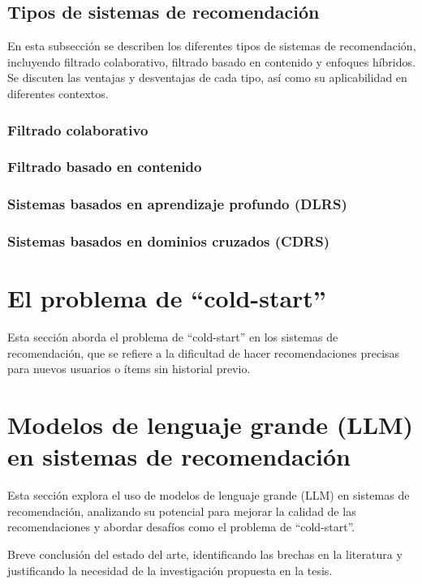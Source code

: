 	\subsection{Tipos de sistemas de recomendación}
	En esta subsección se describen los diferentes tipos de sistemas de recomendación, incluyendo filtrado colaborativo, filtrado basado en contenido y enfoques híbridos. Se discuten las ventajas y desventajas de cada tipo, así como su aplicabilidad en diferentes contextos.

		\subsubsection{Filtrado colaborativo}

		\subsubsection{Filtrado basado en contenido}
		
		\subsubsection{Sistemas basados en aprendizaje profundo (DLRS)}
		
		\subsubsection{Sistemas basados en dominios cruzados (CDRS)}

\section{El problema de \enquote{cold-start}}

	Esta sección aborda el problema de \enquote{cold-start} en los sistemas de recomendación, que se refiere a la dificultad de hacer recomendaciones precisas para nuevos usuarios o ítems sin historial previo.

\section{Modelos de lenguaje grande (LLM) en sistemas de recomendación}

	Esta sección explora el uso de modelos de lenguaje grande (LLM) en sistemas de recomendación, analizando su potencial para mejorar la calidad de las recomendaciones y abordar desafíos como el problema de \enquote{cold-start}.

Breve conclusión del estado del arte, identificando las brechas en la literatura y justificando la necesidad de la investigación propuesta en la tesis.

